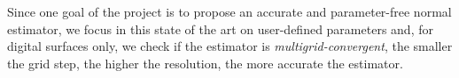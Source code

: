 
Since one goal of the project is to propose an accurate and parameter-free normal estimator,
we focus in this state of the art on user-defined parameters and, for digital surfaces only,
we check if the estimator is \emph{multigrid-convergent}, \ie the smaller the grid step,
the higher the resolution, the more accurate the estimator. 








